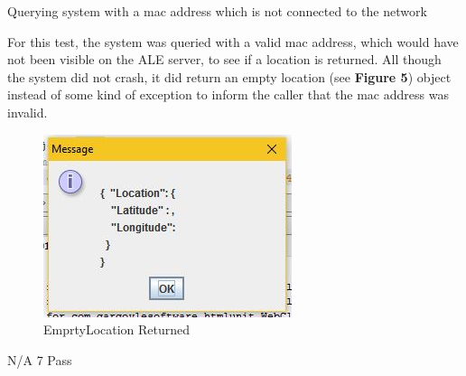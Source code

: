 \FuncReq
{Querying system with a mac address which is not connected to the network}
{For this test, the system was queried with a valid mac address, which would have not been visible on the ALE server, to see if a location is returned. All though the system did not crash, it did return an empty location (see \textbf{Figure 5}) object instead of some kind of exception to inform the caller that the mac address was invalid.
			\begin{figure}[h]
				\centering
				\includegraphics{functional/images/wrong_mac.jpg}
				\caption{EmprtyLocation Returned}
				\label{fig:LocationReturned}
			\end{figure}
}
{N/A}
{7}
{Pass}